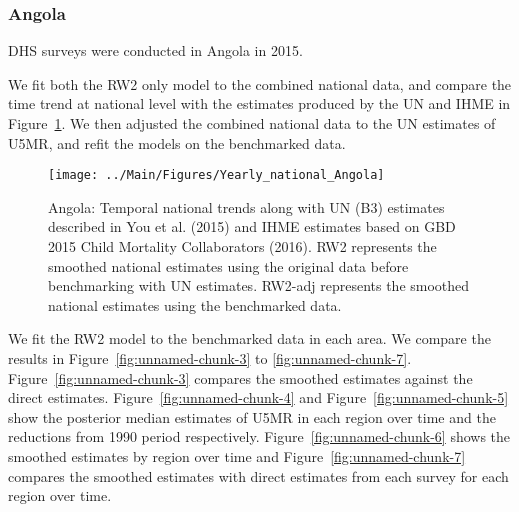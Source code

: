 \documentclass[12pt]{article}\usepackage[]{graphicx}\usepackage[]{color}
\newenvironment{knitrout}{}{} %
\begin{document}
\subsubsection{Angola}





DHS surveys were conducted in Angola in 2015.

We fit both the RW2 only model to the combined national data, and compare the time trend at national level with the estimates produced by the UN and IHME in Figure~\ref{fig:unnamed-chunk-2}. We then adjusted the combined national data to the UN estimates of U5MR, and refit the models on the benchmarked data. 

\begin{knitrout}
\color{fgcolor}\begin{figure}[bht]

{\centering \texttt{[image: ../Main/Figures/Yearly\_national\_Angola]} 

}

\caption[Angola]{Angola: Temporal national trends along with UN (B3) estimates described in You et al. (2015) and IHME estimates based on GBD 2015 Child Mortality Collaborators (2016). RW2 represents the smoothed national estimates using the original data before benchmarking with UN estimates. RW2-adj represents the smoothed national estimates using the benchmarked data.}\label{fig:unnamed-chunk-2}
\end{figure}


\end{knitrout}
 

We fit the RW2 model to the benchmarked data in each area. 
We compare the results in Figure~\ref{fig:unnamed-chunk-3} to \ref{fig:unnamed-chunk-7}.
Figure~\ref{fig:unnamed-chunk-3} compares the smoothed estimates against the direct estimates. Figure~\ref{fig:unnamed-chunk-4} and Figure~\ref{fig:unnamed-chunk-5} show the posterior median estimates of U5MR in each region over time and the reductions from 1990 period respectively.
Figure~\ref{fig:unnamed-chunk-6} shows the smoothed estimates by region over time and Figure~\ref{fig:unnamed-chunk-7} compares the smoothed estimates with direct estimates from each survey for each region over time.
\end{document}
